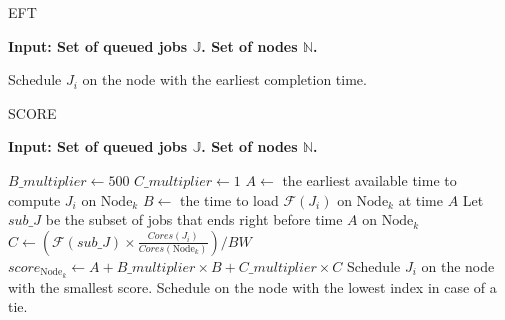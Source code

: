 \documentclass[a4paper]{article}
\newcommand{\Node}[1]{\ensuremath{\mathrm{Node}_{#1}}\xspace}
\newcommand{\inputs}{\ensuremath{\mathcal{F}}\xspace}
\newcommand{\memory}{\ensuremath{\mathcal{M}}\xspace}
\newcommand{\bandwidth}{\mathit{BW}\xspace}
\newcommand{\core}{\mathit{Cores}\xspace}
\newcommand{\jobset}{\ensuremath{\mathbb{J}}\xspace}
\newcommand{\nodeset}{\ensuremath{\mathbb{N}}\xspace}
\begin{document}
\begin{algorithm}[htbp]
\caption{EFT}
\hspace*{\algorithmicindent} \textbf{Input: Set of queued jobs $\jobset$. Set of nodes $\nodeset$.} \\
\begin{algorithmic}[0]
\ForEach {$J_i \in \jobset$}
	\State Schedule $J_i$ on the node with the earliest completion time. 
\EndFor
\end{algorithmic}
\end{algorithm}

\begin{algorithm}[htbp]
\caption{SCORE}
\hspace*{\algorithmicindent} \textbf{Input: Set of queued jobs $\jobset$. Set of nodes $\nodeset$.} \\
\begin{algorithmic}[0]
\State $B\_multiplier \gets 500$
\State $C\_multiplier \gets 1$
\ForEach {$J_i \in \jobset$}
	\ForEach {$\Node{k} \in \nodeset$}
		\State $A \gets$ the earliest available time to compute $J_i$ on $\Node{k}$
		\State $B \gets$ the time to load $\inputs(J_i)$ on $\Node{k}$ at time $A$ 
		\State Let $\mathit{sub\_J}$ be the subset of jobs that ends right before time $A$ on $\Node{k}$
		\State $C \gets (\inputs(\mathit{sub\_J}) \times \frac{\core(J_i)}{\core(\Node{k})})/\bandwidth$
		\State $score_{\Node{k}} \gets A + B\_multiplier \times B + C\_multiplier \times C$
	\EndFor
	\State Schedule $J_i$ on the node with the smallest score. Schedule on the node with the lowest index in case of a tie.
\EndFor
\end{algorithmic}
\end{algorithm}
\end{document}
